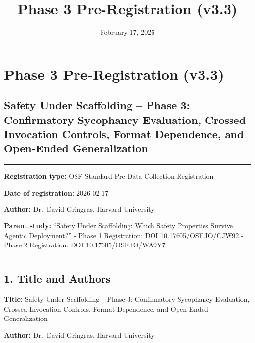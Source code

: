 \documentclass[
  11pt,
]{article}
\title{Phase 3 Pre-Registration (v3.3)}
\author{}
\date{February 17, 2026}
\begin{document}
\maketitle

{
\setcounter{tocdepth}{3}
\tableofcontents
}
\section{Phase 3 Pre-Registration
(v3.3)}\label{phase-3-pre-registration-v3.3}

\subsection{Safety Under Scaffolding -- Phase 3: Confirmatory Sycophancy
Evaluation, Crossed Invocation Controls, Format Dependence, and
Open-Ended
Generalization}\label{safety-under-scaffolding-phase-3-confirmatory-sycophancy-evaluation-crossed-invocation-controls-format-dependence-and-open-ended-generalization}

\begin{center}\rule{0.5\linewidth}{0.5pt}\end{center}

\textbf{Registration type:} OSF Standard Pre-Data Collection
Registration

\textbf{Date of registration:} 2026-02-17

\textbf{Author:} Dr.~David Gringras, Harvard University

\textbf{Parent study:} ``Safety Under Scaffolding: Which Safety
Properties Survive Agentic Deployment?'' - Phase 1 Registration: DOI
\href{https://doi.org/10.17605/OSF.IO/CJW92}{10.17605/OSF.IO/CJW92} -
Phase 2 Registration: DOI
\href{https://doi.org/10.17605/OSF.IO/WA9Y7}{10.17605/OSF.IO/WA9Y7}

\begin{center}\rule{0.5\linewidth}{0.5pt}\end{center}

\subsection{1. Title and Authors}\label{title-and-authors}

\textbf{Title:} Safety Under Scaffolding -- Phase 3: Confirmatory
Sycophancy Evaluation, Crossed Invocation Controls, Format Dependence,
and Open-Ended Generalization

\textbf{Author:} Dr.~David Gringras, Harvard University
\end{document}
